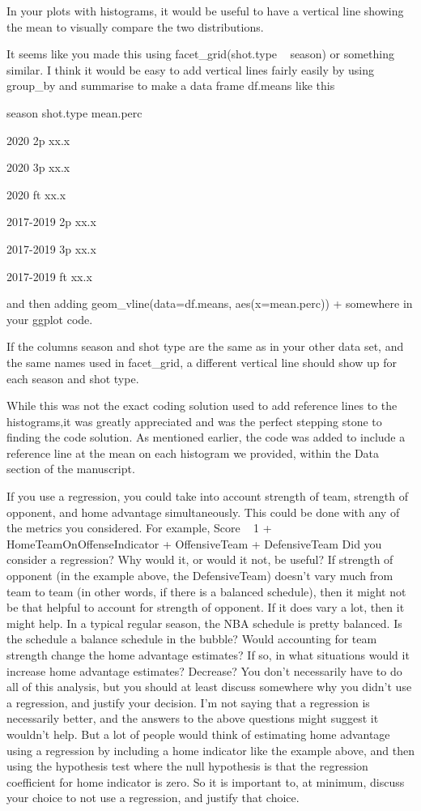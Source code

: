 \documentclass[12pt]{article}
\newenvironment{comment}%
{\begin{quoting}\noindent\small\it\ignorespaces%
  }{\end{quoting}}
\begin{document}
\begin{comment}
In your plots with histograms, it would be useful to have a vertical 
line showing the mean to visually compare
the two distributions.

It seems like you made this using facet\_grid(shot.type ~ season) or
something similar. I think it would be easy to add vertical lines fairly 
easily by using group\_by and summarise to make a data frame df.means
like this

season shot.type mean.perc

2020 2p xx.x

2020 3p xx.x

2020 ft xx.x

2017-2019 2p xx.x

2017-2019 3p xx.x

2017-2019 ft xx.x

and then adding
geom\_vline(data=df.means, aes(x=mean.perc)) +
somewhere in your ggplot code.

If the columns season and shot type are the same as in your other data
set, and the same names used in facet\_grid, a different vertical line
should show up for each season and shot type.
\end{comment}

 While this was not the exact coding solution used to add reference lines
 to the histograms,it was greatly appreciated and was the perfect stepping 
 stone to finding the code solution. As mentioned earlier, the code was
 added to include a reference line at the mean on each histogram we provided,
 within the Data section of the manuscript.

 
\begin{comment}
If you use a regression, you could take into account strength of team,
strength of opponent, and home advantage simultaneously. This could 
be done with any of the metrics you considered. For example,
Score ~ 1 + HomeTeamOnOffenseIndicator + OffensiveTeam + DefensiveTeam
Did you consider a regression? Why would it, or would it not, be useful? 
If strength of opponent (in the example above, the DefensiveTeam) doesn’t
vary much from team to team (in other words, if there is a
balanced schedule), then it might not be that helpful to account for 
strength of opponent. If it does vary a lot, then it might help.
In a typical regular season, the NBA schedule is pretty balanced. 
Is the schedule a balance schedule in the bubble?
Would accounting for team strength change the home advantage estimates? If so, 
in what situations would it increase home advantage estimates? Decrease?
You don’t necessarily have to do all of this analysis, but you should at least 
discuss somewhere why you didn’t use a regression, and justify your decision.
I’m not saying that a regression is necessarily better, and the answers to 
the above questions might suggest it wouldn’t help. But a lot of people
would think of estimating home advantage using a regression by including a home 
indicator like the example above, and then using the hypothesis test where 
the null hypothesis is that the regression coefficient for home indicator
is zero. So it is important to, at minimum, discuss your choice to not use
a regression, and justify that
choice.
\end{comment}
\end{document}
